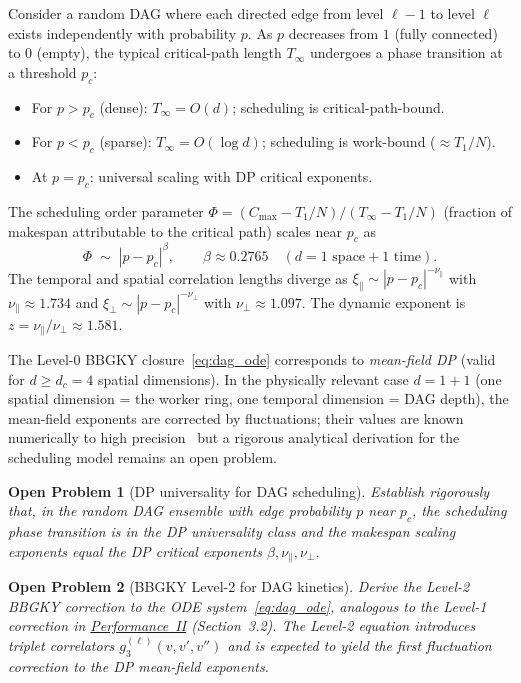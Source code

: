 \documentclass[11pt,a4paper]{article}
\newtheorem{openq}{Open Problem}[section]
\begin{document}
Consider a random DAG where each directed edge from level $\ell{-}1$
to level $\ell$ exists independently with probability $p$.
As $p$ decreases from $1$ (fully connected) to $0$ (empty), the
typical critical-path length $T_\infty$ undergoes a phase transition
at a threshold $p_c$:
\begin{itemize}
  \item For $p > p_c$ (dense): $T_\infty = O(d)$; scheduling is
        critical-path-bound.
  \item For $p < p_c$ (sparse): $T_\infty = O(\log d)$; scheduling is
        work-bound ($\approx T_1/N$).
  \item At $p = p_c$: universal scaling with DP critical exponents.
\end{itemize}
The scheduling order parameter
$\Phi = (C_{\max} - T_1/N)/(T_\infty - T_1/N)$
(fraction of makespan attributable to the critical path)
scales near $p_c$ as~\cite{hinrichsen2000}
\[
  \Phi \;\sim\; |p - p_c|^{\beta},
  \qquad
  \beta \approx 0.2765 \quad (d=1\text{ space} + 1\text{ time}).
\]
The temporal and spatial correlation lengths diverge as
$\xi_\parallel \sim |p-p_c|^{-\nu_\parallel}$ with $\nu_\parallel \approx 1.734$
and $\xi_\perp \sim |p-p_c|^{-\nu_\perp}$ with $\nu_\perp \approx 1.097$.
The dynamic exponent is $z = \nu_\parallel/\nu_\perp \approx 1.581$.

The Level-0 BBGKY closure~\eqref{eq:dag_ode} corresponds to
\emph{mean-field DP} (valid for $d \geq d_c = 4$ spatial dimensions).
In the physically relevant case $d = 1+1$ (one spatial dimension = the
worker ring, one temporal dimension = DAG depth), the mean-field exponents
are corrected by fluctuations; their values are known numerically to high
precision~\cite{hinrichsen2000} but a rigorous analytical derivation for
the scheduling model remains an open problem.

\begin{openq}[DP universality for DAG scheduling]
Establish rigorously that, in the random DAG ensemble with edge probability
$p$ near $p_c$, the scheduling phase transition is in the DP universality
class and the makespan scaling exponents equal the DP critical exponents
$\beta, \nu_\parallel, \nu_\perp$.
\end{openq}

\begin{openq}[BBGKY Level-2 for DAG kinetics]
Derive the Level-2 BBGKY correction to the ODE system~\eqref{eq:dag_ode},
analogous to the Level-1 correction in
\hyperref[chap:kinetic_theory]{Performance~II} (Section~3.2).
The Level-2 equation introduces triplet correlators
$g_3^{(\ell)}(v,v',v'')$ and is expected to yield the first
fluctuation correction to the DP mean-field exponents.
\end{openq}
\end{document}
